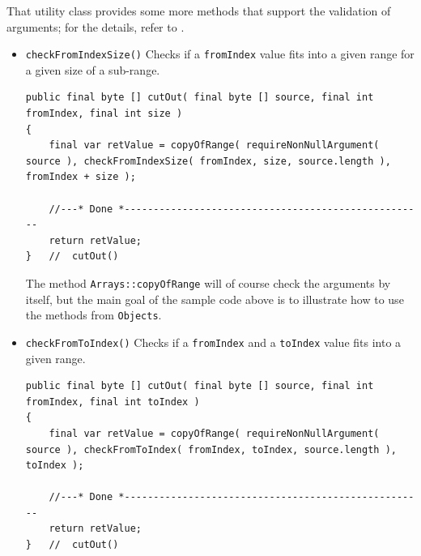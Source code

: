 That utility class provides some more methods that support the validation of arguments; for the details, refer to \autocite{TQUADRAT_ORG_FOUNDATION_OBJECTS}.

\begin{itemize}
\item{\lstinline|checkFromIndexSize()|\autocite{TQUADRAT_ORG_FOUNDATION_OBJECTS:checkFromIndexSize} Checks if a \lstinline|fromIndex| value fits into a given range for a given size of a sub-range.

\begin{lstlisting}
public final byte [] cutOut( final byte [] source, final int fromIndex, final int size )
{
    final var retValue = copyOfRange( requireNonNullArgument( source ), checkFromIndexSize( fromIndex, size, source.length ), fromIndex + size );
	 
    //---* Done *----------------------------------------------------
    return retValue;
}   //  cutOut()
\end{lstlisting}

The method \lstinline|Arrays::copyOfRange|\autocite{ORACLE_DOC_ARRAYS:copyOfRange} will of course check the arguments by itself, but the main goal of the sample code above is to illustrate how to use the methods from \lstinline|Objects|.}

\item{\lstinline|checkFromToIndex()|\autocite{TQUADRAT_ORG_FOUNDATION_OBJECTS:checkFromToIndex} Checks if a \lstinline|fromIndex| and a \lstinline|toIndex| value fits into a given range.
\begin{lstlisting}
public final byte [] cutOut( final byte [] source, final int fromIndex, final int toIndex )
{
    final var retValue = copyOfRange( requireNonNullArgument( source ), checkFromToIndex( fromIndex, toIndex, source.length ), toIndex );
	 
    //---* Done *----------------------------------------------------
    return retValue;
}   //  cutOut()
\end{lstlisting}}


\end{itemize}
